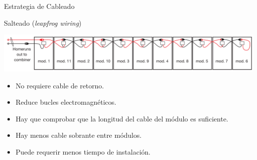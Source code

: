 \documentclass[aspectratio=169, usenames,svgnames,dvipsnames]{beamer}
\begin{document}
\begin{frame}[label={sec:org5db57dd}]{Estrategia de Cableado}
\begin{block}{Salteado (\emph{leapfrog wiring})}
\begin{center}
\includegraphics[width=\textwidth]{../figs/LeapfrogWiring.png}
\end{center}

\begin{itemize}
\item No requiere cable de retorno.
\item Reduce bucles electromagnéticos.
\item Hay que comprobar que la longitud del cable del módulo es suficiente.
\item Hay menos cable sobrante entre módulos.
\item Puede requerir menos tiempo de instalación.
\end{itemize}
\end{block}
\end{frame}
\end{document}
